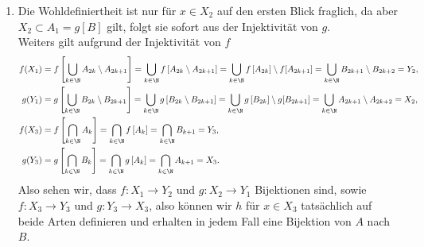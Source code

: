 \begin{solution}
\begin{enumerate}[label = \alph*.]
  \item Die Wohldefiniertheit ist nur für $x \in X_2$ auf den ersten Blick fraglich,
  da aber $X_2 \subset A_1 = g[B]$ gilt, folgt sie sofort aus der Injektivität von $g$. \\
  Weiters gilt aufgrund der Injektivität von $f$
  \begin{align*}
    f(X_1) &= f\left[\bigcup_{k\in\N}A_{2k}\setminus A_{2k+1}\right]
    = \bigcup_{k\in\N}f\left[A_{2k}\setminus A_{2k+1}\right]
    = \bigcup_{k\in\N}f\left[A_{2k}\right]\setminus f[A_{2k+1}]
    = \bigcup_{k\in\N}B_{2k+1}\setminus B_{2k+2} = Y_2, \\
    g(Y_1) &= g\left[\bigcup_{k\in\N}B_{2k}\setminus B_{2k+1}\right]
    = \bigcup_{k\in\N}g\left[B_{2k}\setminus B_{2k+1}\right]
    = \bigcup_{k\in\N}g\left[B_{2k}] \setminus g[B_{2k+1}\right]
    = \bigcup_{k\in\N}A_{2k+1}\setminus A_{2k+2} = X_2, \\
    f(X_3) &= f\left[\bigcap_{k \in \N} A_k\right]
    = \bigcap_{k \in \N}f\left[A_k\right]
    = \bigcap_{k \in \N}B_{k+1} = Y_3, \\
    g(Y_3) &= g\left[\bigcap_{k \in \N} B_k\right]
    = \bigcap_{k \in \N}g\left[A_k\right]
    = \bigcap_{k \in \N}A_{k+1} = X_3.
  \end{align*}
  Also sehen wir, dass $f: X_1 \to Y_2$ und $g: X_2 \to Y_1$ Bijektionen sind,
  sowie $f: X_3 \to Y_3$ und $g: Y_3 \to X_3$, also können wir $h$ für $x \in X_3$
  tatsächlich auf beide Arten definieren und erhalten in jedem Fall eine Bijektion
  von $A$ nach $B$.
\end{enumerate}


\end{solution}
